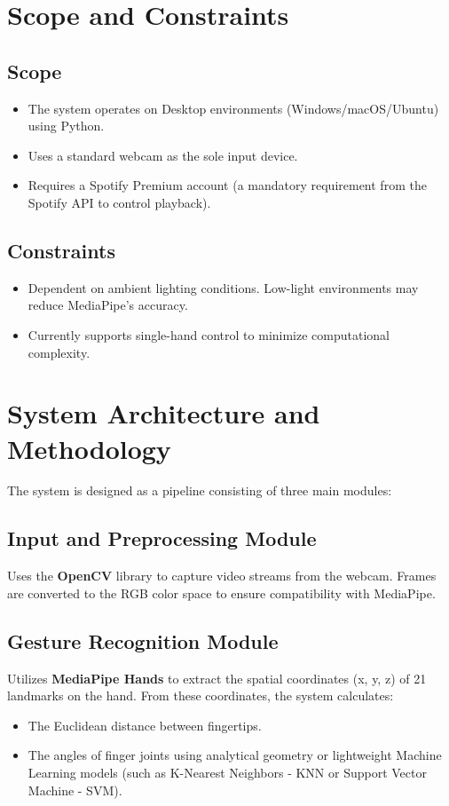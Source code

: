\documentclass[12pt,a4paper]{article}
\begin{document}
\section{Scope and Constraints}
\subsection{Scope}
\begin{itemize}
    \item The system operates on Desktop environments (Windows/macOS/Ubuntu) using Python.
    \item Uses a standard webcam as the sole input device.
    \item Requires a Spotify Premium account (a mandatory requirement from the Spotify API to control playback).
\end{itemize}

\subsection{Constraints}
\begin{itemize}
    \item Dependent on ambient lighting conditions. Low-light environments may reduce MediaPipe's accuracy.
    \item Currently supports single-hand control to minimize computational complexity.
\end{itemize}

\section{System Architecture and Methodology}

The system is designed as a pipeline consisting of three main modules:

\subsection{Input and Preprocessing Module}
Uses the \textbf{OpenCV} library to capture video streams from the webcam. Frames are converted to the RGB color space to ensure compatibility with MediaPipe.

\subsection{Gesture Recognition Module}
Utilizes \textbf{MediaPipe Hands} to extract the spatial coordinates (x, y, z) of 21 landmarks on the hand. From these coordinates, the system calculates:
\begin{itemize}
    \item The Euclidean distance between fingertips.
    \item The angles of finger joints using analytical geometry or lightweight Machine Learning models (such as K-Nearest Neighbors - KNN or Support Vector Machine - SVM).
\end{itemize}
\end{document}
